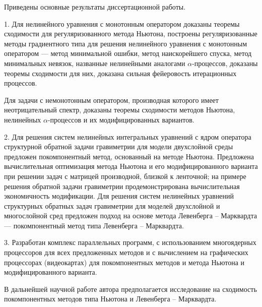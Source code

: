 \conclusion

Приведены основные результаты диссертационной работы.

1. Для нелинейного уравнения с монотонным оператором доказаны теоремы сходимости для регуляризованного метода Ньютона, построены регуляризованные методы градиентного типа для решения нелинейного уравнения с монотонным оператором --- метод минимальной ошибки, метод наискорейшего спуска, метод минимальных невязок, названные нелинейными аналогами $\alpha$-процессов, доказаны теоремы сходимости для них, доказана сильная фейеровость итерационных процессов.

 Для задачи с немонотонным оператором, производная которого имеет неотрицательный спектр, доказаны теоремы сходимости методов Ньютона, нелинейных $\alpha$-процессов и их модифицированных вариантов. 

2. Для решения систем нелинейных интегральных уравнений  с ядром оператора структурной обратной задачи гравиметрии для модели двухслойной среды предложен покомпонентный метод, основанный на методе Ньютона. Предложена вычислительная оптимизация метода Ньютона и его модифицированного варианта при решении задач с матрицей производной, близкой к ленточной; на примере решения обратной задачи гравиметрии продемонстрирована вычислительная экономичность модификации. Для решения систем нелинейных уравнений  структурных обратных задач гравиметрии для моделей двухслойной и многослойной сред предложен подход на основе метода Левенберга -- Марквардта --- покомпонентный метод типа Левенберга -- Марквардта.

3. Разработан комплекс параллельных программ, с использованием многоядерных процессоров для всех предложенных методов и с вычислением на графических процессорах (видеокартах) для покомпонентных методов и метода Ньютона и модифицированного варианта.

В дальнейшей научной работе автора предполагается исследование на сходимость покомпонентных методов типа Ньютона и Левенберга -- Марквардта.
